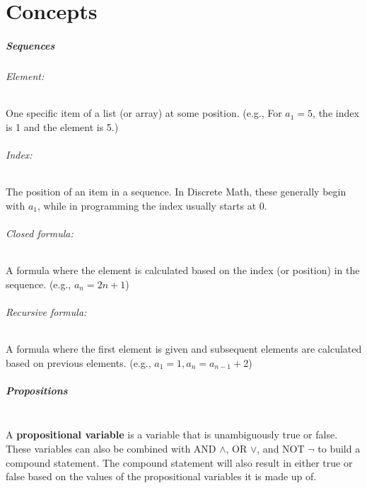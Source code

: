 
\newcommand{\laClass}       {CS 210}
\newcommand{\laSemester}    {Spring 2018}
\newcommand{\laChapter}     {}
\newcommand{\laType}        {}
\newcommand{\laPoints}      {5}
\newcommand{\laTitle}       {Exam 1 Review}
\newcommand{\laDate}        {}
\setcounter{chapter}{1}
\setcounter{section}{1}
\addtocounter{section}{-1}

\toggletrue{answerkey}
\togglefalse{answerkey}



    \chapter*{Concepts}

    \paragraph{Sequences}

    \subparagraph{Element:} One specific item of a list (or array) at some position.
        (e.g., For $a_{1} = 5$, the index is 1 and the element is 5.)

    \subparagraph{Index:} The position of an item in a sequence. In Discrete Math,
        these generally begin with $a_{1}$, while in programming the index
        usually starts at 0.

    \subparagraph{Closed formula:} A formula where the element is calculated based
        on the index (or position) in the sequence. (e.g., $a_{n} = 2n + 1$)

    \subparagraph{Recursive formula:} A formula where the first element is given
        and subsequent elements are calculated based on previous elements.
        (e.g., $a_{1} = 1, a_{n} = a_{n-1} + 2$)

    \paragraph{Propositions}  ~\\
    
        A \textbf{propositional variable} is a variable that is unambiguously
        true or false. These variables can also be combined with AND $\land$,{}
        OR $\lor$, and NOT $\neg$ to build a compound statement. The compound
        statement will also result in either true or false based on the values
        of the propositional variables it is made up of.

